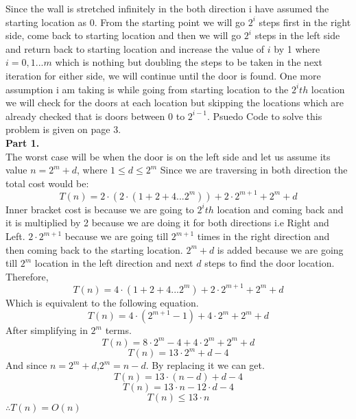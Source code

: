 \documentclass[a4paper,11pt]{article}
\theoremstyle{quest}
\newenvironment{solution}[2][Solution]{\begin{trivlist}
		\item[\hskip \labelsep {\bfseries #1}\hskip \labelsep {\bfseries #2.}]}{\end{trivlist}}
\begin{document}
\newpage
\begin{solution}2
	Since the wall is stretched infinitely in the both direction i have assumed the starting location as 0. From the starting point we will go $2^{i}$ steps first in the right side, come back to starting location and then we will go $2^{i}$ steps in the left side and return back to starting location and increase the value of $i$ by 1 where $i = 0,1...m$ which is nothing but doubling the steps to be taken in the next iteration for either side, we will continue until the door is found. One more assumption i am taking is while going from starting location to the $2^{i}th$ location we will check for the doors at each location but skipping the locations which are already checked that is doors between $0$ to $2^{i-1}$. Psuedo Code to solve this problem is given on page 3.\\
	
	\textbf{Part 1.}\\
	
	The worst case will be when the door is on the left side and let us assume its value $n = 2^{m}+d$, where $ 1 \leq d \leq 2^{m}$ 
	Since we are traversing in both direction the total cost would be:
	\begin{equation*}
	T(n) = 2 \cdot (2\cdot( 1+2+4...2^{m})) + 2\cdot 2^{m+1} + 2^{m}+d
	\end{equation*}
	Inner bracket cost is because we are going to $2^{i}th$ location and coming back and it is multiplied by 2 because we are doing it for both directions i.e Right and Left. $2\cdot 2^{m+1}$ because we are going till $2^{m+1}$ times in the right direction and then coming back to the starting location. $2^{m}+d$ is added because we are going till $2^{m}$ location in the left direction and next $d$ steps to find the door location. Therefore, 
	\begin{equation*}
	T(n) = 4 \cdot ( 1+2+4...2^{m}) + 2\cdot 2^{m+1} + 2^{m}+d
	\end{equation*}
	Which is equivalent to the following equation.
	\begin{equation*}
	T(n) = 4 \cdot (2^{m+1} - 1) + 4\cdot 2^{m} + 2^{m}+d
	\end{equation*}
	After simplifying in $2^{m}$ terms.
	\begin{equation*}
	T(n) = 8 \cdot 2^{m} - 4 + 4\cdot 2^{m} + 2^{m}+d
	\end{equation*}
	\begin{equation*}
	T(n) = 13 \cdot 2^{m} + d -4
	\end{equation*}
	And since $n = 2^{m} + d$,$ 2^{m} = n-d$. By replacing it we can get.
	\begin{equation*}
	T(n) = 13 \cdot (n-d) + d - 4
	\end{equation*}
	\begin{equation*}
	T(n) = 13 \cdot n - 12\cdot d - 4
	\end{equation*}
	\begin{equation*}
	T(n) \leq 13 \cdot n
	\end{equation*}
	$\therefore T(n) = O(n)$\\
	

\end{solution}
\end{document}
